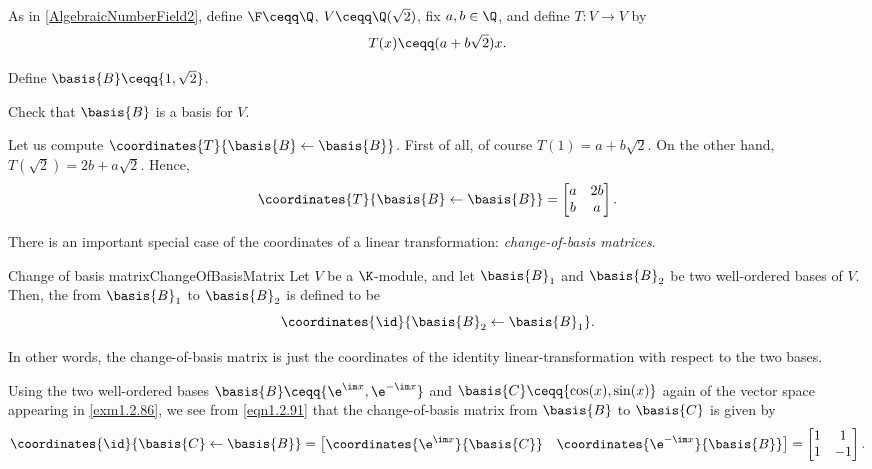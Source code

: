 \begin{exm}{}{}
	As in \cref{AlgebraicNumberField2}, define $\F \ceqq \Q$, $V\ceqq \Q (\sqrt{2})$, fix $a,b\in \Q$, and define $T\colon V\rightarrow V$ by
	\begin{equation}
		T(x)\ceqq (a+b\sqrt{2})x.
	\end{equation}
	
	Define $\basis{B}\ceqq \{ 1,\sqrt{2}\}$.
	\begin{exr}[breakable=false]{}{}
		Check that $\basis{B}$ is a basis for $V$.
	\end{exr}
	Let us compute $\coordinates{T}{\basis{B}\leftarrow \basis{B}}$.  First of all, of course $T(1)=a+b\sqrt{2}$.  On the other hand, $T(\sqrt{2})=2b+a\sqrt{2}$.  Hence,
	\begin{equation}
		\coordinates{T}{\basis{B}\leftarrow \basis{B}}=\begin{bmatrix}a & 2b \\ b & a\end{bmatrix}.
	\end{equation}
\end{exm}

There is an important special case of the coordinates of a linear transformation:  \emph{change-of-basis matrices}.
\begin{dfn}{Change of basis matrix}{ChangeOfBasisMatrix}
	Let $V$ be a $\K$-module, and let $\basis{B}_1$ and $\basis{B}_2$ be two well-ordered bases of $V$.  Then, the  from $\basis{B}_1$ to $\basis{B}_2$ is defined to be
	\begin{equation}
		\coordinates{\id}{\basis{B}_2\leftarrow \basis{B}_1}.
	\end{equation}
	\begin{rmk}
		In other words, the change-of-basis matrix is just the coordinates of the identity linear-transformation with respect to the two bases.
	\end{rmk}
\end{dfn}
\begin{exm}{}{}
	Using the two well-ordered bases $\basis{B}\ceqq \{ \e ^{\im x},\e ^{-\im x}\}$ and $\basis{C}\ceqq \{ \cos (x),\sin (x)\}$ again of the vector space appearing in \cref{exm1.2.86}, we see from \eqref{eqn1.2.91} that the change-of-basis matrix from $\basis{B}$ to $\basis{C}$ is given by
	\begin{equation}
		\coordinates{\id}{\basis{C}\leftarrow \basis{B}}=\begin{bmatrix}\coordinates{\e ^{\im x}}{\basis{C}} & \coordinates{\e ^{-\im x}}{\basis{B}}\end{bmatrix}=\begin{bmatrix}1 & 1 \\ 1 & -1\end{bmatrix}.
	\end{equation}
\end{exm}

